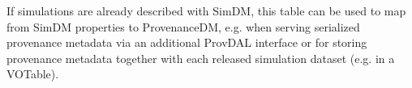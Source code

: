 If simulations are already described with SimDM, this table can be used
to map from SimDM properties to ProvenanceDM, e.g. when serving serialized provenance
metadata via an additional ProvDAL interface or for storing provenance
metadata together with each released simulation dataset (e.g. in a VOTable).

